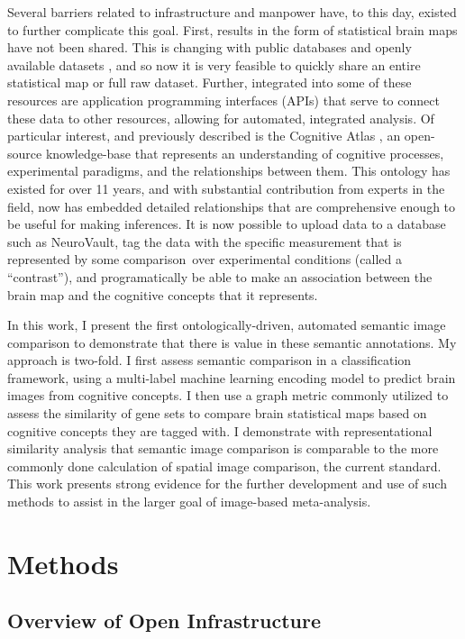 \documentclass{report}
\begin{document}
Several barriers related to infrastructure and manpower have, to this
day, existed to further complicate this goal. First, results in the form
of statistical brain maps have not been shared. This is changing with
public databases and openly available datasets \cite{Gorgolewski2015-gu,Van_Essen2013-fi,Hall2012-qo,Reid2015-gt}, and so now it is very feasible to quickly share an entire statistical
map or full raw dataset. Further, integrated into some of these
resources are application programming interfaces (APIs) that serve to
connect these data to other resources, allowing for automated,
integrated analysis. Of particular interest, and previously described is the Cognitive Atlas \cite{Poldrack2011-jp}, an open-source knowledge-base that represents an understanding of
cognitive processes, experimental paradigms, and the relationships
between them. This ontology has existed for over 11 years, and with
substantial contribution from experts in the field, now has embedded
detailed relationships that are comprehensive enough to be useful for
making inferences. It is now possible to upload data to a database such
as NeuroVault, tag the data with the specific measurement that is
represented by some comparison~over experimental conditions (called a
``contrast''), and programatically be able to make an association
between the brain map and the cognitive concepts that it represents.

In this work, I present the first ontologically-driven, automated
semantic image comparison to demonstrate that there is value in these
semantic annotations. My approach is two-fold. I first assess semantic
comparison in a classification framework, using a multi-label machine
learning encoding model to predict brain images from cognitive concepts.
I then use a graph metric commonly utilized to assess the similarity of
gene sets to compare brain statistical maps based on cognitive concepts
they are tagged with. I demonstrate with representational similarity
analysis that semantic image comparison is comparable to the more
commonly done calculation of spatial image comparison, the current
standard. This work presents strong evidence for the further development
and use of such methods to assist in the larger goal of image-based
meta-analysis.

\section{Methods}

\subsection{Overview of Open Infrastructure}
\end{document}
